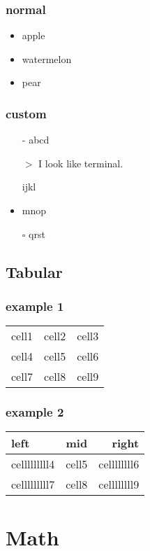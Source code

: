 \documentclass{article}
\begin{document}
\subsubsection{normal}

\begin{itemize}
    \item apple
    \item watermelon
    \item pear
\end{itemize}

\subsubsection{custom}

\begin{itemize}
    \item[-] abcd
    \item[$>$] I look like terminal.
    \item[] ijkl
    \item mnop
    \item[$\square$] qrst
\end{itemize}

\subsection{Tabular}

\subsubsection{example 1}
\begin{tabular}{c|c c}
    cell1 & cell2 & cell3 \\
    cell4 & cell5 & cell6 \\  
    cell7 & cell8 & cell9    
\end{tabular}

\subsubsection{example 2}
\begin{tabular}{l|c|r}
    left & mid & right \\
    \hline
    celllllllll4 & cell5 & cellllllll6 \\  
    \hline
    celllllllll7 & cell8 & cellllllll9    
\end{tabular}

\newpage
\section{Math}
\end{document}
